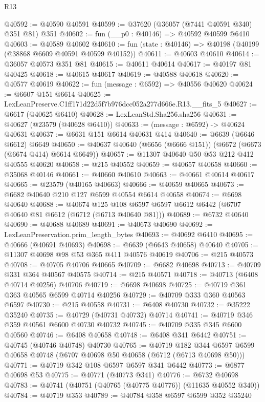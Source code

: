 \begin{lexlean}{R13}
\begin{coremodule}
@40592 := @40590 @40591
@40599 := @37620 (@36057 (@7441 @40591 @340) @351 @81) @351
@40602 := fun (__p0 : @40146) => @40592 @40599 @6410
@40603 := @40589 @40602
@40610 := fun (state : @40146) => @40198 (@40199 (@38868 @6609 @40591 @40599 @40152))
@40611 := @40603 @40610
@40614 := @36057 @40573 @351 @81
@40615 := @40611 @40614
@40617 := @40197 @81 @40425
@40618 := @40615 @40617
@40619 := @40588 @40618
@40620 := @40577 @40619
@40622 := fun (message : @6592) => @40556 @40620
@40624 := @6607 @151 @6614
@40625 := LexLeanPreserve.C1ff171d22d5f7b976dcc052a277d666e.R13.__fits_5
@40627 := @6617 (@40625 @6410)
@40628 := LexLeanStd.Sha256.sha256
@40631 := @40627 (@23579 (@40628 @6410))
@40633 := (message : @6592) -> @40624 @40631
@40637 := @6631 @151 @6614 @40631 @414
@40640 := @6639 (@6646 @6612) @6649
@40650 := @40637 @40640 (@6656 (@6666 @151)) (@6672 (@6673 (@6674 @414) @6614 @6649))
@40657 := @11307 @40640 @50 @53 @212 @412 @40555 @40620
@40658 := @215 @40552
@40659 := @40657 @40658
@40660 := @35068 @40146
@40661 := @40660 @40610
@40663 := @40661 @40614 @40617
@40665 := @23579 (@40165 @40663)
@40666 := @40659 @40665
@40673 := @6682 @40640 @210 @127 @6599 @40554 @6614 @40658
@40674 := @6698 @40640
@40688 := @40674
    @125
    @108
    @6597
    @6597
    @6612
    @6442
    (@6707 @40640 @81 @6612 (@6712 (@6713 @40640 @81)))
@40689 := @6732 @40640
@40690 := @40688 @40689
@40691 := @40673 @40690
@40692 := LexLeanPreservation.prim_length_bytes
@40693 := @40692 @6410
@40695 := @40666 (@40691 @40693)
@40698 := @6639 (@6643 @40658) @40640
@40705 := @11307 @40698 @98 @53 @365 @411 @40576 @40619
@40706 := @215 @40573
@40708 := @40705 @40706 @40665
@40709 := @6682 @40698
@40713 := @40709 @331 @364 @40567 @40575
@40714 := @215 @40571
@40718 := @40713 (@6408 @40714 @40256) @40706
@40719 := @6698 @40698
@40725 := @40719 @361 @363 @40565 @6599 @40714 @40256
@40729 := @40709 @333 @360 @40563 @6597
@40730 := @215 @40558
@40731 := @6408 @40730
@40732 := @35222 @35240
@40735 := @40729 (@40731 @40732) @40714
@40741 := @40719 @346 @359 @40561 @6600 @40730 @40732
@40745 := @40709 @335 @345 @6600 @40560
@40746 := @6408 @40658
@40748 := @6408 @341 @6442
@40751 := @40745 (@40746 @40748) @40730
@40765 := @40719
    @182
    @344
    @6597
    @6599
    @40658
    @40748
    (@6707 @40698 @50 @40658 (@6712 (@6713 @40698 @50)))
@40771 := @40719 @342 @108 @6597 @6597 @341 @6442
@40773 := @6877 @40698 @53
@40775 := @40771 (@40773 @341)
@40776 := @6732 @40698
@40783 := @40741 (@40751 (@40765 (@40775 @40776)) (@11635 @40552 @340))
@40784 := @40719 @353
@40789 := @40784 @358 @6597 @6599 @352 @35240

\end{coremodule}
\end{lexlean}

